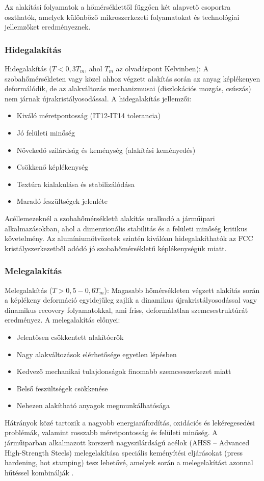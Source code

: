 \documentclass[12pt,a4paper,oneside]{report}
\begin{document}
Az alakítási folyamatok a hőmérséklettől függően két alapvető csoportra oszthatók, amelyek különböző mikroszerkezeti folyamatokat és technológiai jellemzőket eredményeznek.

\subsubsection*{Hidegalakítás}
Hidegalakítás ($T < 0,3T_m$, ahol $T_m$ az olvadáspont Kelvinben): A szobahőmérsékleten vagy közel ahhoz végzett alakítás során az anyag képlékenyen deformálódik, de az alakváltozás mechanizmusai (diszlokációs mozgás, csúszás) nem járnak újrakristályosodással. A hidegalakítás jellemzői:
\begin{itemize}
    \item Kiváló méretpontosság (IT12-IT14 tolerancia)
    \item Jó felületi minőség
    \item Növekedő szilárdság és keménység (alakítási keményedés)
    \item Csökkenő képlékenység
    \item Textúra kialakulása és stabilizálódása
    \item Maradó feszültségek jelenléte
\end{itemize}
Acéllemezeknél a szobahőmérsékletű alakítás uralkodó a járműipari alkalmazásokban, ahol a dimenzionális stabilitás és a felületi minőség kritikus követelmény. Az alumíniumötvözetek szintén kiválóan hidegalakíthatók az FCC kristályszerkezetből adódó jó szobahőmérsékletű képlékenységük miatt.

\subsubsection*{Melegalakítás}
Melegalakítás ($T > 0,5-0,6T_m$): Magasabb hőmérsékleten végzett alakítás során a képlékeny deformáció egyidejűleg zajlik a dinamikus újrakristályosodással vagy dinamikus recovery folyamatokkal, ami friss, deformálatlan szemcsestruktúrát eredményez. A melegalakítás előnyei:
\begin{itemize}
    \item Jelentősen csökkentett alakítóerők
    \item Nagy alakváltozások elérhetősége egyetlen lépésben
    \item Kedvező mechanikai tulajdonságok finomabb szemcseszerkezet miatt
    \item Belső feszültségek csökkenése
    \item Nehezen alakítható anyagok megmunkálhatósága
\end{itemize}
Hátrányok közé tartozik a nagyobb energiaráfordítás, oxidációs és lekéregesedési problémák, valamint rosszabb méretpontosság és felületi minőség. A járműiparban alkalmazott korszerű nagyszilárdságú acélok (AHSS – Advanced High-Strength Steels) melegelakítása speciális keményítési eljárásokat (press hardening, hot stamping) tesz lehetővé, amelyek során a melegelakítást azonnal hűtéssel kombinálják \cite{Pereira2024}.
\end{document}
